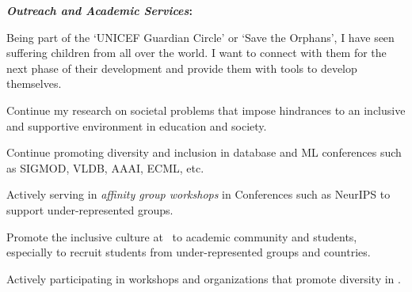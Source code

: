 \documentclass[9pt]{article}
\newcommand*\heading[1]{\textbf{\textit{#1}:}}
\begin{document}
% 

\heading{Outreach and Academic Services}
\begin{enumerate*}[leftmargin=*, noitemsep, topsep=0pt, label=(\arabic*)]
    \item Being part of the `UNICEF Guardian Circle' or `Save the Orphans', I have seen suffering children from all over the world. I want to connect with them for the next phase of their development 
    and provide them with tools to develop themselves.
    \item Continue my research on societal problems that impose hindrances to an inclusive and supportive environment in education and society. 
    \item Continue promoting diversity and inclusion in database and ML conferences such as SIGMOD, VLDB, AAAI, ECML, etc. %
    \item Actively serving in \textit{affinity group workshops} in Conferences such as NeurIPS to support under-represented groups.
    \item Promote the inclusive culture at \InstitutionName ~to academic community and students, especially to recruit students from under-represented groups and countries. 
    \item Actively participating in workshops and organizations	that	promote diversity	in	\shortInstitutionName.%
\end{enumerate*}
\end{document}
